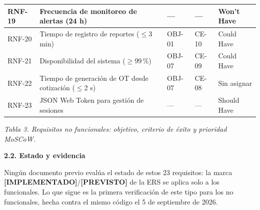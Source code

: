 \documentclass[12pt,varwidth=170mm,border=10pt]{standalone}
\newcommand{\subsectiontitle}[1]{%
  \par\vspace{1.3ex}%
  {\normalfont\large\bfseries #1\par}%
  \vspace{0.5ex}%
}
\newcommand{\estadoImplementado}{\textcolor{mainRed}{\textbf{[IMPLEMENTADO]}}}
\newcommand{\estadoPrevisto}{\textcolor{mainGray}{\textbf{[PREVISTO]}}}
\newcommand{\hueco}{---}
\newcommand{\tablecaption}[2]{%
  \par\vspace{0.4em}%
  \begin{center}
    \footnotesize\textit{Tabla #1. #2}
  \end{center}
  \vspace{1.0em}%
}
\begin{document}
\begin{center}
\begin{tabular}{|p{1.5cm}|p{5.1cm}|p{2.5cm}|p{2.1cm}|p{2.3cm}|}
\hline
RNF-19 & Frecuencia de monitoreo de alertas (24 h) & \hueco{} & \hueco{} & Won't Have \\
\hline
RNF-20 & Tiempo de registro de reportes ($\leq$3 min) & OBJ-01 & CE-10 & Could Have \\
\hline
RNF-21 & Disponibilidad del sistema ($\geq$99\,\%) & OBJ-07 & CE-09 & Could Have \\
\hline
RNF-22 & Tiempo de generación de OT desde cotización ($\leq$2 s) & OBJ-07 & CE-08 & Sin asignar \\
\hline
RNF-23 & JSON Web Token para gestión de sesiones & \hueco{} & \hueco{} & Should Have \\
\hline
\end{tabular}
\end{center}
\tablecaption{3}{Requisitos no funcionales: objetivo, criterio de éxito y prioridad MoSCoW.}
\endgroup

\subsectiontitle{2.2. Estado y evidencia}

Ningún documento previo evalúa el estado de estos 23 requisitos: la marca \estadoImplementado{}/\estadoPrevisto{} de la ERS se aplica solo a los funcionales. Lo que sigue es la primera verificación de este tipo para los no funcionales, hecha contra el mismo código el 5 de septiembre de 2026.
\end{document}
